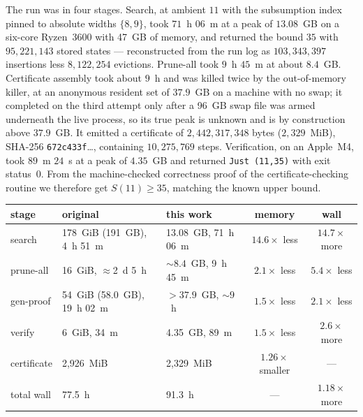 \documentclass[11pt,a4paper]{article}
\theoremstyle{plain}
\theoremstyle{definition}
\theoremstyle{remark}
\begin{document}
The run was in four stages. Search, at ambient $11$ with the subsumption index
pinned to absolute widths $\{8,9\}$, took $71$~h $06$~m at a peak of
$13.08$~GB on a six-core Ryzen~3600 with 47~GB of memory, and returned the
bound $35$ with $95{,}221{,}143$ stored states --- reconstructed from the run
log as $103{,}343{,}397$ insertions less $8{,}122{,}254$ evictions. Prune-all
took $9$~h $45$~m at about $8.4$~GB. Certificate assembly took about $9$~h and
was killed twice by the out-of-memory killer, at an anonymous resident set of
$37.9$~GB on a machine with no swap; it completed on the third attempt only
after a 96~GB swap file was armed underneath the live process, so its true peak
is unknown and is by construction above $37.9$~GB. It emitted a certificate of
$2{,}442{,}317{,}348$ bytes ($2{,}329$~MiB), SHA-256
\texttt{672c433f}\ldots, containing $10{,}275{,}769$ steps. Verification, on an
Apple~M4, took $89$~m $24$~s at a peak of $4.35$~GB and returned
\texttt{Just (11,35)} with exit status~$0$. From the machine-checked
correctness proof of the certificate-checking routine we therefore get
$S(11) \ge 35$, matching the known upper bound.

\begin{center}
\small
\begin{tabular}{lllcc}
\toprule
stage & original~\cite{Harder20} & this work & memory & wall \\
\midrule
search      & 178~GiB (191~GB), 4~h 51~m & 13.08~GB, 71~h 06~m & $14.6\times$ less & $14.7\times$ more \\
prune-all   & 16~GiB, $\approx$2~d 5~h   & ${\sim}8.4$~GB, 9~h 45~m & $2.1\times$ less & $5.4\times$ less \\
gen-proof   & 54~GiB (58.0~GB), 19~h 02~m & $>37.9$~GB, ${\sim}9$~h & $1.5\times$ less & $2.1\times$ less \\
verify      & 6~GiB, 34~m                & 4.35~GB, 89~m       & $1.5\times$ less & $2.6\times$ more \\
certificate & 2{,}926~MiB                & 2{,}329~MiB         & $1.26\times$ smaller & --- \\
\midrule
total wall  & 77.5~h                     & 91.3~h              & ---               & $1.18\times$ more \\
\bottomrule
\end{tabular}
\end{center}
\end{document}
